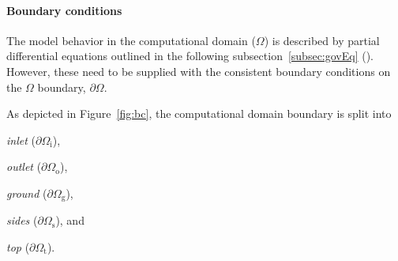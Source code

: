\paragraph{Boundary conditions} The model behavior in the computational domain ($\Omega$) is described by partial differential equations outlined in the following subsection~\ref{subsec:govEq} (). However, these need to be supplied with the consistent boundary conditions on the $\Omega$ boundary, $\partial\Omega$. 

As depicted in Figure~\ref{fig:bc}, the computational domain boundary is split into 
\begin{inparaenum}[(i)]
    \item \textit{inlet} ($\partial\Omega_{\mathrm{i}}$),
    \item \textit{outlet} ($\partial\Omega_{\mathrm{o}}$),
    \item \textit{ground} ($\partial\Omega_{\mathrm{g}}$),
    \item \textit{sides} ($\partial\Omega_{\mathrm{s}}$), and
    \item \textit{top} ($\partial\Omega_{\mathrm{t}}$).
\end{inparaenum}
 
